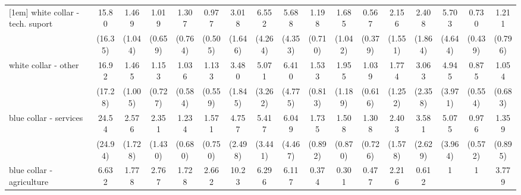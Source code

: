 {\begin{tabular}{l*{16}{c}}
[1em]
white collar - tech. suport&       15.80\sym{**} &       1.469         &       1.019         &       1.307         &       0.977         &       3.018\sym{*}  &       6.552\sym{**} &       5.688\sym{*}  &       1.198         &       1.685         &       0.567         &       2.156         &       2.408         &       5.703\sym{*}  &       0.730         &       1.211         \\
                    &     (16.35)         &     (1.044)         &     (0.659)         &     (0.764)         &     (0.505)         &     (1.646)         &     (4.264)         &     (4.353)         &     (0.710)         &     (1.042)         &     (0.379)         &     (1.551)         &     (1.864)         &     (4.644)         &     (0.439)         &     (0.796)         \\
[1em]
white collar - other&       16.92\sym{**} &       1.465         &       1.153         &       1.036         &       1.133         &       3.480\sym{*}  &       5.071\sym{*}  &       6.410\sym{*}  &       1.533         &       1.955         &       1.039         &       1.774         &       3.063         &       4.945\sym{*}  &       0.875         &       1.054         \\
                    &     (17.28)         &     (1.005)         &     (0.727)         &     (0.584)         &     (0.559)         &     (1.845)         &     (3.262)         &     (4.775)         &     (0.813)         &     (1.189)         &     (0.616)         &     (1.252)         &     (2.358)         &     (3.971)         &     (0.554)         &     (0.683)         \\
[1em]
blue collar - services&       24.54\sym{**} &       2.576         &       2.351         &       1.234         &       1.571         &       4.757\sym{**} &       5.417\sym{**} &       6.049\sym{*}  &       1.735         &       1.508         &       1.308         &       2.403         &       3.581         &       5.075\sym{*}  &       0.976         &       1.359         \\
                    &     (24.94)         &     (1.728)         &     (1.430)         &     (0.680)         &     (0.750)         &     (2.498)         &     (3.441)         &     (4.467)         &     (0.892)         &     (0.870)         &     (0.726)         &     (1.578)         &     (2.629)         &     (3.964)         &     (0.572)         &     (0.895)         \\
[1em]
blue collar - agriculture&       6.632         &       1.778         &       2.767         &       1.728         &       2.662         &       10.23\sym{**} &       6.296\sym{*}  &       6.117         &       0.374         &       0.301         &       0.477         &       2.216         &       0.612         &           1         &           1         &       3.779         \\

\end{tabular}}
